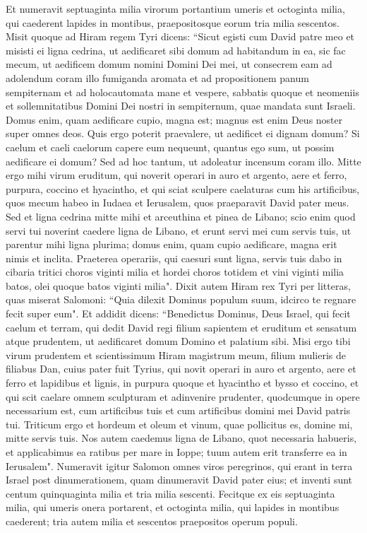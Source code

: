 \begin{biblechapter}  
\verse Et numeravit septuaginta milia virorum portantium umeris et octoginta milia, qui caederent lapides in montibus, praepositosque eorum tria milia sescentos. 
\verse Misit quoque ad Hiram regem Tyri dicens: “Sicut egisti cum David patre meo et misisti ei ligna cedrina, ut aedificaret sibi domum ad habitandum in ea, 
\verse sic fac mecum, ut aedificem domum nomini Domini Dei mei, ut consecrem eam ad adolendum coram illo fumiganda aromata et ad propositionem panum sempiternam et ad holocautomata mane et vespere, sabbatis quoque et neomeniis et sollemnitatibus Domini Dei nostri in sempiternum, quae mandata sunt Israeli.  
\verse Domus enim, quam aedificare cupio, magna est; magnus est enim Deus noster super omnes deos. 
\verse Quis ergo poterit praevalere, ut aedificet ei dignam domum? Si caelum et caeli caelorum capere eum nequeunt, quantus ego sum, ut possim aedificare ei domum? Sed ad hoc tantum, ut adoleatur incensum coram illo.  
\verse Mitte ergo mihi virum eruditum, qui noverit operari in auro et argento, aere et ferro, purpura, coccino et hyacintho, et qui sciat sculpere caelaturas cum his artificibus, quos mecum habeo in Iudaea et Ierusalem, quos praeparavit David pater meus. 
\verse Sed et ligna cedrina mitte mihi et arceuthina et pinea de Libano; scio enim quod servi tui noverint caedere ligna de Libano, et erunt servi mei cum servis tuis, 
\verse ut parentur mihi ligna plurima; domus enim, quam cupio aedificare, magna erit nimis et inclita. 
\verse Praeterea operariis, qui caesuri sunt ligna, servis tuis dabo in cibaria tritici choros viginti milia et hordei choros totidem et vini viginti milia batos, olei quoque batos viginti milia". 
\verse Dixit autem Hiram rex Tyri per litteras, quas miserat Salomoni: “Quia dilexit Dominus populum suum, idcirco te regnare fecit super eum". 
\verse Et addidit dicens: “Benedictus Dominus, Deus Israel, qui fecit caelum et terram, qui dedit David regi filium sapientem et eruditum et sensatum atque prudentem, ut aedificaret domum Domino et palatium sibi. 
\verse Misi ergo tibi virum prudentem et scientissimum Hiram magistrum meum, 
\verse filium mulieris de filiabus Dan, cuius pater fuit Tyrius, qui novit operari in auro et argento, aere et ferro et lapidibus et lignis, in purpura quoque et hyacintho et bysso et coccino, et qui scit caelare omnem sculpturam et adinvenire prudenter, quodcumque in opere necessarium est, cum artificibus tuis et cum artificibus domini mei David patris tui. 
\verse Triticum ergo et hordeum et oleum et vinum, quae pollicitus es, domine mi, mitte servis tuis. 
\verse Nos autem caedemus ligna de Libano, quot necessaria habueris, et applicabimus ea ratibus per mare in Ioppe; tuum autem erit transferre ea in Ierusalem". 
\verse Numeravit igitur Salomon omnes viros peregrinos, qui erant in terra Israel post dinumerationem, quam dinumeravit David pater eius; et inventi sunt centum quinquaginta milia et tria milia sescenti. 
\verse Fecitque ex eis septuaginta milia, qui umeris onera portarent, et octoginta milia, qui lapides in montibus caederent; tria autem milia et sescentos praepositos operum populi. 
\end{biblechapter}


